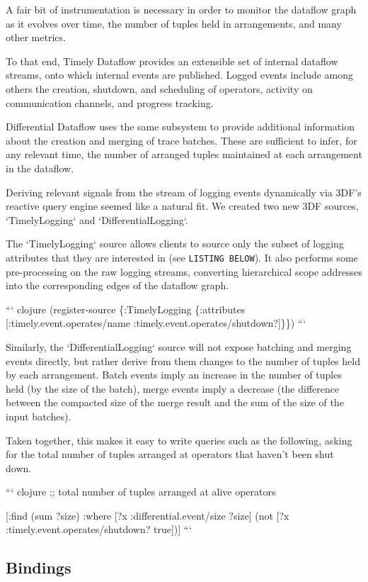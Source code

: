 \documentclass[../index.tex]{subfiles}
\begin{document}
A fair bit of instrumentation is necessary in order to monitor the
dataflow graph as it evolves over time, the number of tuples held in
arrangements, and many other metrics.

To that end, Timely Dataflow provides an extensible set of internal
dataflow streams, onto which internal events are published. Logged
events include among others the creation, shutdown, and scheduling of
operators, activity on communication channels, and progress tracking.

Differential Dataflow uses the same subsystem to provide additional
information about the creation and merging of trace batches. These are
sufficient to infer, for any relevant time, the number of arranged
tuples maintained at each arrangement in the dataflow.

Deriving relevant signals from the stream of logging events
dynamically via 3DF's reactive query engine seemed like a natural
fit. We created two new 3DF sources, `TimelyLogging` and
`DifferentialLogging`.

The `TimelyLogging` source allows clients to source only the subset of
logging attributes that they are interested in (see \texttt{LISTING
BELOW}). It also performs some pre-processing on the raw logging
streams, converting hierarchical scope addresses into the
corresponding edges of the dataflow graph.

``` clojure
(register-source
  \{:TimelyLogging
   \{:attributes [:timely.event.operates/name
                 :timely.event.operates/shutdown?]\}\})
```

Similarly, the `DifferentialLogging` source will not expose batching
and merging events directly, but rather derive from them changes to
the number of tuples held by each arrangement. Batch events imply an
increase in the number of tuples held (by the size of the batch),
merge events imply a decrease (the difference between the compacted
size of the merge result and the sum of the size of the input
batches).

Taken together, this makes it easy to write queries such as the
following, asking for the total number of tuples arranged at operators
that haven't been shut down.

``` clojure
;; total number of tuples arranged at alive operators

[:find (sum ?size)
 :where
 [?x :differential.event/size ?size]
 (not [?x :timely.event.operates/shutdown? true])]
```

\subsection{Bindings} \label{bindings}
\end{document}
